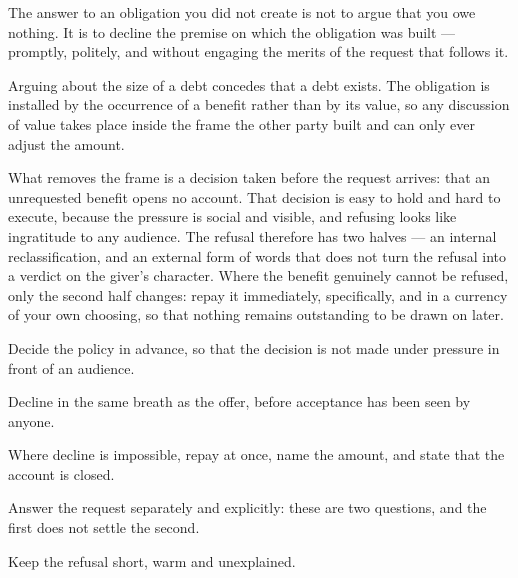 


\begin{core}
The answer to an obligation you did not create is not to argue that you owe nothing. It is to decline the premise on which the obligation was built --- promptly, politely, and without engaging the merits of the request that follows it.
\end{core}

\begin{mechanism}
Arguing about the size of a debt concedes that a debt exists. The obligation is installed by the occurrence of a benefit rather than by its value, so any discussion of value takes place inside the frame the other party built and can only ever adjust the amount.

What removes the frame is a decision taken before the request arrives: that an unrequested benefit opens no account. That decision is easy to hold and hard to execute, because the pressure is social and visible, and refusing looks like ingratitude to any audience. The refusal therefore has two halves --- an internal reclassification, and an external form of words that does not turn the refusal into a verdict on the giver's character. Where the benefit genuinely cannot be refused, only the second half changes: repay it immediately, specifically, and in a currency of your own choosing, so that nothing remains outstanding to be drawn on later.
\end{mechanism}

\begin{application}
  \item Decide the policy in advance, so that the decision is not made under pressure in front of an audience.
  \item Decline in the same breath as the offer, before acceptance has been seen by anyone.
  \item Where decline is impossible, repay at once, name the amount, and state that the account is closed.
  \item Answer the request separately and explicitly: these are two questions, and the first does not settle the second.
  \item Keep the refusal short, warm and unexplained.
\end{application}

